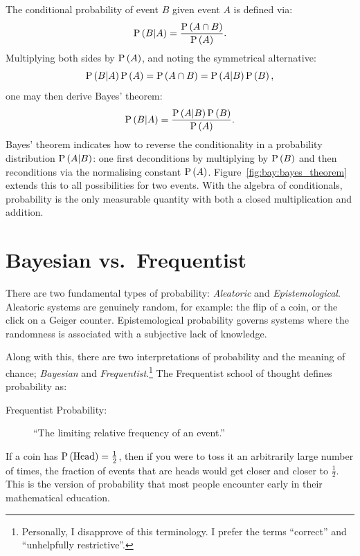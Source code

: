%    


The conditional probability of event $B$ given event $A$ is defined via:
\begin{equation}
  \mathrm{P}\left(B\middle|A\right) = \frac{\mathrm{P}\left(A\cap B\right)}{\mathrm{P}\left(A\right)}.
  \label{eqn:bay:cond}
\end{equation}
Multiplying both sides by $\mathrm{P}\left(A\right)$, and noting the symmetrical alternative:
\begin{equation}
  \mathrm{P}\left(B\middle|A\right)\mathrm{P}\left(A\right) = \mathrm{P}\left(A\cap B\right) = \mathrm{P}\left(A\middle|B\right)\mathrm{P}\left(B\right),
  \label{eqn:bay:sym}
\end{equation}
one may then derive Bayes' theorem:
\begin{equation}
  \mathrm{P}\left(B\middle|A\right) = \frac{\mathrm{P}\left(A\middle|B\right)\mathrm{P}\left(B\right)}{\mathrm{P}\left(A\right)}.
  \label{eqn:bay:bayes}
\end{equation}
Bayes' theorem indicates how to reverse the conditionality in a probability distribution $\mathrm{P}\left(A\middle|B\right)$: one first deconditions by multiplying by $\mathrm{P}\left(B\right)$ and then reconditions via the normalising constant $\mathrm{P}\left(A\right)$. Figure~\ref{fig:bay:bayes_theorem} extends this to all possibilities for two events.
With the algebra of conditionals, probability is the only measurable quantity with both a closed multiplication and addition.

\section{Bayesian vs.\ Frequentist}
\label{sec:bay:bayesian_frequentist}

There are two fundamental types of probability: {\em Aleatoric\/} and {\em Epistemological}. Aleatoric systems are genuinely random, for example: the flip of a coin, or the click on a Geiger counter. Epistemological probability governs systems where the randomness is associated with a subjective lack of knowledge. 

Along with this, there are two interpretations of probability and the meaning of chance; {\em Bayesian\/} and {\em Frequentist}.\footnote{Personally, I disapprove of this terminology. I prefer the terms ``correct'' and ``unhelpfully restrictive''.}
The Frequentist school of thought defines probability as:
\begin{description}
  \item[Frequentist Probability:]``The limiting relative frequency of an event.''
\end{description}
If a coin has $\mathrm{P}\left(\mathrm{Head}\right)=\frac{1}{2}$, then if you were to toss it an arbitrarily large number of times, the fraction of events that are heads would get closer and closer to $\frac{1}{2}$. This is the version of probability that most people encounter early in their mathematical education. 

